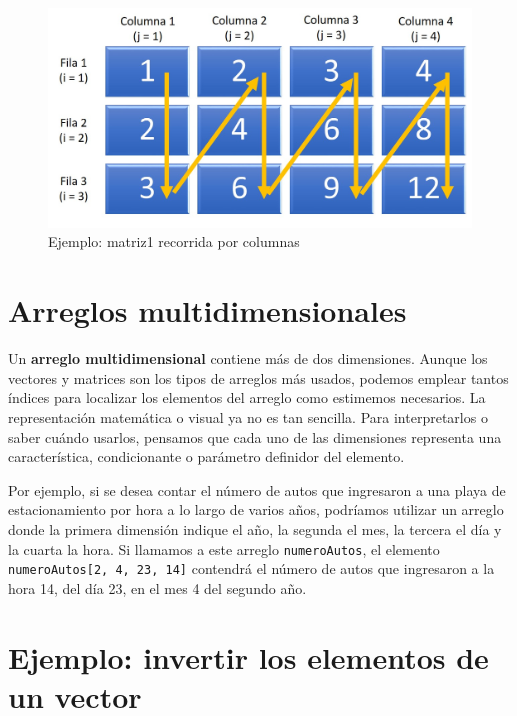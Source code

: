 \documentclass[]{book}
\begin{document}
\begin{figure}

{\centering \includegraphics[width=0.8\linewidth]{images/13_matriz1bis} 

}

\caption{Ejemplo: matriz1 recorrida por columnas}\label{fig:matriz1bis}
\end{figure}

\hypertarget{arreglos-multidimensionales}{%
\section{Arreglos multidimensionales}\label{arreglos-multidimensionales}}

Un \textbf{arreglo multidimensional} contiene más de dos dimensiones. Aunque los vectores y matrices son los tipos de arreglos más usados, podemos emplear tantos índices para localizar los elementos del arreglo como estimemos necesarios. La representación matemática o visual ya no es tan sencilla. Para interpretarlos o saber cuándo usarlos, pensamos que cada uno de las dimensiones representa una característica, condicionante o parámetro definidor del elemento.

Por ejemplo, si se desea contar el número de autos que ingresaron a una playa de estacionamiento por hora a lo largo de varios años, podríamos utilizar un arreglo donde la primera dimensión indique el año, la segunda el mes, la tercera el día y la cuarta la hora. Si llamamos a este arreglo \texttt{numeroAutos}, el elemento \texttt{numeroAutos{[}2,\ 4,\ 23,\ 14{]}} contendrá el número de autos que ingresaron a la hora 14, del día 23, en el mes 4 del segundo año.

\hypertarget{ejemplo-invertir-los-elementos-de-un-vector}{%
\section{Ejemplo: invertir los elementos de un vector}\label{ejemplo-invertir-los-elementos-de-un-vector}}
\end{document}
